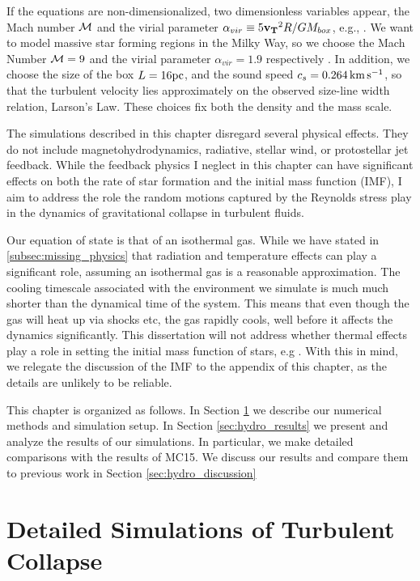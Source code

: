 \documentclass[../dissertation.tex]{subfiles}
\begin{document}
If the equations are non-dimensionalized, two dimensionless variables appear, the Mach number ${\cal M}$ and the virial parameter $\alpha_{vir} \equiv 5 \mathbf{v_T}^2 R / GM_{box}$, e.g., \citet{1984oup..book.....M}.
We want to model massive star forming regions in the Milky Way, so we choose the Mach Number ${\cal M} = 9$ and the virial parameter $\alpha_{vir} = 1.9$ respectively \citep{1987ApJ...319..730S}. 
In addition, we choose the size of the box $L = 16 \rm pc$, and the sound speed $c_s = 0.264\,{\rm km\,s^{-1}}$, so that the turbulent velocity lies approximately on the observed size-line width relation, Larson's Law.
These choices fix both the density and the mass scale.

The simulations described in this chapter disregard several physical effects.
They do not include magnetohydrodynamics, radiative, stellar wind, or protostellar jet feedback.
While the feedback physics I neglect in this chapter can have significant effects on both the rate of star formation and the initial mass function (IMF), I aim to address the role the random motions captured by the Reynolds stress play in the dynamics of gravitational collapse in turbulent fluids.

Our equation of state is that of an isothermal gas. 
While we have stated in \ref{subsec:missing_physics} that radiation and temperature effects can play a significant role, 
assuming an isothermal gas is a reasonable approximation. 
The cooling timescale associated with the environment we simulate is much much shorter than the dynamical time of the system. 
This means that even though the gas will heat up via shocks etc, the gas rapidly cools, well before it affects the dynamics significantly. 
This dissertation will not address whether thermal effects play a role in setting the initial mass function of stars, e.g \citet{2005MNRAS.359..211L}.
With this in mind, we relegate the discussion of the IMF to the appendix of this chapter, as the details are unlikely to be reliable.

This chapter is organized as follows. In Section \ref{sec:hydro_simulation setup}
we describe our numerical methods and simulation setup. In Section
\ref{sec:hydro_results} we present and analyze the results of our simulations. 
In particular, we make detailed comparisons with the results of MC15.  
We discuss our results and compare
them to previous work in Section \ref{sec:hydro_discussion}


\section{Detailed Simulations of Turbulent Collapse} \label{sec:hydro_simulation setup}
\end{document}
